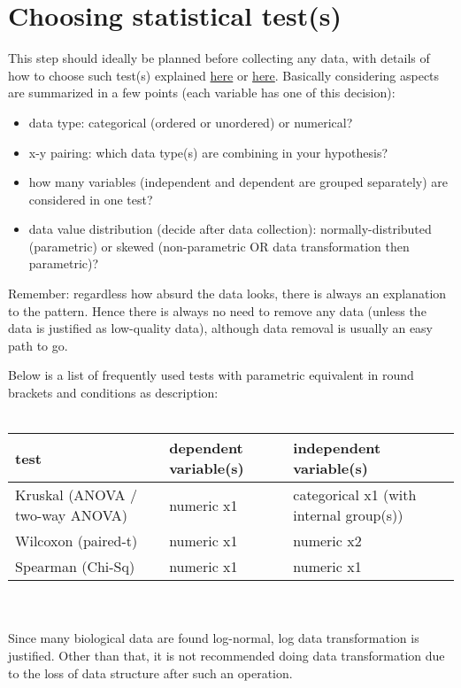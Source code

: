 \documentclass[../note.tex]{subfiles} %
\begin{document}
\section{Choosing statistical test(s)}
This step should ideally be planned before collecting any data, with details of how to choose such test(s) explained \href{https://www.dataanalytics.org.uk/data-analytics-knowledge-base-tips-tricks-r-excel/statistics-guide/which-statistics-test/}{here} or \href{http://stats.idre.ucla.edu/other/mult-pkg/whatstat/}{here}.  Basically considering aspects are summarized in a few points (each variable has one of this decision):
\begin{itemize}
    \item data type: categorical (ordered or unordered) or numerical?
    \item x-y pairing: which data type(s) are combining in your hypothesis?
    \item how many variables (independent and dependent are grouped separately) are considered in one test?
    \item data value distribution (decide after data collection): normally-distributed (parametric) or skewed (non-parametric OR data transformation then parametric)?
\end{itemize}

Remember: regardless how absurd the data looks, there is always an explanation to the pattern.  Hence there is always no need to remove any data (unless the data is justified as low-quality data), although data removal is usually an easy path to go.

Below is a list of frequently used tests with parametric equivalent in round brackets and conditions as description:\\\\
\begin{tabular}{p{.4\linewidth}|p{.2\linewidth}p{.4\linewidth}}
    test & dependent variable(s) & independent variable(s)\\\hline
    Kruskal (ANOVA / two-way ANOVA) & numeric x1 & categorical x1 (with internal group(s)) \\
    Wilcoxon (paired-t) & numeric x1 & numeric x2 \\
    Spearman (Chi-Sq) & numeric x1 & numeric x1\\\hline
\end{tabular}\\\\

Since many biological data are found log-normal, log data transformation is justified.  Other than that, it is not recommended doing data transformation due to the loss of data structure after such an operation.
\end{document}
